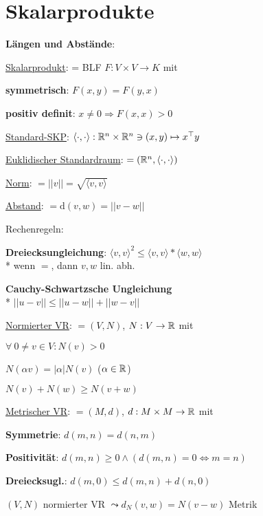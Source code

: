 \section{\label{sec:Skalarprodukte}Skalarprodukte}

\textbf{Längen und Abstände}:
\begin{items}
	\item \underline{Skalarprodukt}: = BLF \( F: V \times V \to K \) mit
		\begin{enumeration}
			\item \textbf{symmetrisch}: \( F(x,y) = F(y,x) \)
			\item \textbf{positiv definit}: \( x \neq 0 \Rightarrow F(x,x) > 0 \)
		\end{enumeration}
	\item \underline{Standard-SKP}: \( \langle \cdot, \cdot \rangle: \mathbb{R}^n \times \mathbb{R}^n \ni (x,y) \mapsto x^\top y \)
	\item \underline{Euklidischer Standardraum}: \( = (\mathbb{R}^n, \langle \cdot, \cdot \rangle) \)
	\item \underline{Norm}: \( = ||v|| = \sqrt{\langle v,v \rangle} \)
	\item \underline{Abstand}: \( = \text{d}(v,w) = ||v-w|| \)
	\item Rechenregeln:
		\begin{enumeration}
			\item \textbf{Dreiecksungleichung}: \( \langle v,v \rangle^2 \leq \langle v,v \rangle * \langle w,w \rangle \)
				\\*
				wenn \( = \), dann \( v,w \) lin. abh.
			\item \textbf{Cauchy-Schwartzsche Ungleichung} \\* \( ||u-v|| \leq ||u-w||+||w-v|| \)
		\end{enumeration}

	\item \underline{Normierter VR}: \( = (V,N) \), \( N: V \to \mathbb{R} \) mit
		\begin{enumeration}
			\item \( \forall \ 0 \neq v \in V : N(v) > 0 \)
			\item \( N(\alpha v) = |\alpha|N(v) \) (\( \alpha \in \mathbb{R} \))
			\item \( N(v)+N(w) \geq N(v+w) \)
		\end{enumeration}
	\item \underline{Metrischer VR}: \( =(M,d) \), \( d: M \times M \to \mathbb{R} \) mit
		\begin{enumeration}
			\item \textbf{Symmetrie}: \( d(m,n) = d(n,m) \)
			\item \textbf{Positivität}: \( d(m,n) \geq 0 \wedge (d(m,n) = 0 \Leftrightarrow m = n) \)
			\item \textbf{Dreiecksugl.}: \( d(m,0) \leq d(m,n) + d(n,0) \)
		\end{enumeration}
		\( (V, N) \) normierter VR \( \leadsto d_N(v,w) = N(v-w) \) Metrik


\end{items}
